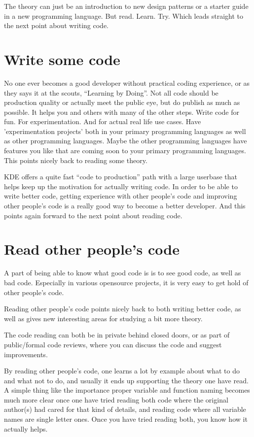 The theory can just be an introduction to new design patterns or a starter guide in a new programming language. But read. Learn. Try. Which leads straight to the next point about writing code.

\section*{Write some code}
No one ever becomes a good developer without practical coding experience, or as they says it at the scouts, “Learning by Doing”. Not all code should be production quality or actually meet the public eye, but do publish as much as possible. It helps you and others with many of the other steps. Write code for fun. For experimentation. And for actual real life use cases. Have 'experimentation projects' both in your primary programming languages as well as other programming languages. Maybe the other programming languages have features you like that are coming soon to your primary programming languages. This points nicely back to reading some theory.

KDE offers a quite fast “code to production” path with a large userbase that helps keep up the motivation for actually writing code.
In order to be able to write better code, getting experience with other people's code and improving other people's code is a really good way to become a better developer. And this points again forward to the next point about reading code.

\section*{Read other people's code}
A part of being able to know what good code is is to see good code, as well as bad code. Especially in various opensource projects, it is very easy to get hold of other people's code.

Reading other people's code points nicely back to both writing better code, as well as gives new interesting areas for studying a bit more theory.

The code reading can both be in private behind closed doors, or as part of public/formal code reviews, where you can discuss the code and suggest improvements.

By reading other people's code, one learns a lot by example about what to do and what not to do, and usually it ends up supporting the theory one have read. A simple thing like the importance proper variable and function naming becomes much more clear once one have tried reading both code where the original author(s) had cared for that kind of details, and reading code where all variable names are single letter ones. Once you have tried reading both, you know how it actually helps.

